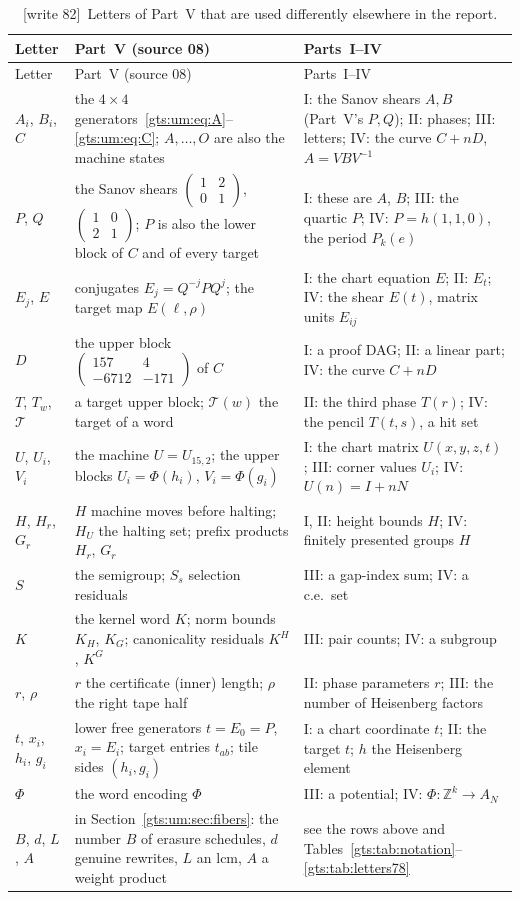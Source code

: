 \documentclass[11pt,letterpaper]{article}
\theoremstyle{definition}
\theoremstyle{remark}
\newcommand{\Z}{\mathbb Z}
\newcommand{\smallmat}[4]{\begin{pmatrix}#1&#2\\#3&#4\end{pmatrix}}
\newcommand{\wtagc}{\textup{[write 82]}}
\begin{document}
\begin{center}
\small
\begin{longtable}{@{}L{.13\textwidth}L{.45\textwidth}L{.34\textwidth}@{}}
\caption{\wtagc\ Letters of Part~V that are used differently elsewhere in the report.}\label{gts:um:tab:letters}\\
\toprule
Letter & Part~V (source 08) & Parts~I--IV\\
\midrule
\endfirsthead
\toprule
Letter & Part~V (source 08) & Parts~I--IV\\
\midrule
\endhead
$A_i$, $B_i$, $C$ & the $4\times4$ generators~\eqref{gts:um:eq:A}--\eqref{gts:um:eq:C}; $A,\ldots,O$ are also the machine states & I: the Sanov shears $A,B$ (Part~V's $P,Q$); II: phases; III: letters; IV: the curve $C+nD$, $A=VBV^{-1}$\\
$P$, $Q$ & the Sanov shears $\smallmat1201$, $\smallmat1021$; $P$ is also the lower block of $C$ and of every target & I: these are $A$, $B$; III: the quartic $P$; IV: $P=h(1,1,0)$, the period $P_k(e)$\\
$E_j$, $E$ & conjugates $E_j=Q^{-j}PQ^j$; the target map $E(\ell,\rho)$ & I: the chart equation $E$; II: $E_t$; IV: the shear $E(t)$, matrix units $E_{ij}$\\
$D$ & the upper block $\smallmat{157}{4}{-6712}{-171}$ of $C$ & I: a proof DAG; II: a linear part; IV: the curve $C+nD$\\
$T$, $T_w$, $\mathcal T$ & a target upper block; $\mathcal T(w)$ the target of a word & II: the third phase $T(r)$; IV: the pencil $T(t,s)$, a hit set\\
$U$, $U_i$, $V_i$ & the machine $U=U_{15,2}$; the upper blocks $U_i=\Phi(h_i)$, $V_i=\Phi(g_i)$ & I: the chart matrix $U(x,y,z,t)$; III: corner values $U_i$; IV: $U(n)=I+nN$\\
$H$, $H_r$, $G_r$ & $H$ machine moves before halting; $H_U$ the halting set; prefix products $H_r$, $G_r$ & I, II: height bounds $H$; IV: finitely presented groups $H$\\
$S$ & the semigroup; $S_s$ selection residuals & III: a gap-index sum; IV: a c.e.\ set\\
$K$ & the kernel word $K$; norm bounds $K_H$, $K_G$; canonicality residuals $K^H$, $K^G$ & III: pair counts; IV: a subgroup\\
$r$, $\rho$ & $r$ the certificate (inner) length; $\rho$ the right tape half & II: phase parameters $r$; III: the number of Heisenberg factors\\
$t$, $x_i$, $h_i$, $g_i$ & lower free generators $t=E_0=P$, $x_i=E_i$; target entries $t_{ab}$; tile sides $(h_i,g_i)$ & I: a chart coordinate $t$; II: the target $t$; $h$ the Heisenberg element\\
$\Phi$ & the word encoding $\Phi$ & III: a potential; IV: $\Phi:\Z^k\to A_N$\\
$B$, $d$, $L$, $A$ & in Section~\ref{gts:um:sec:fibers}: the number $B$ of erasure schedules, $d$ genuine rewrites, $L$ an lcm, $A$ a weight product & see the rows above and Tables~\ref{gts:tab:notation}--\ref{gts:tab:letters78}\\
\bottomrule
\end{longtable}
\end{center}
\end{document}
